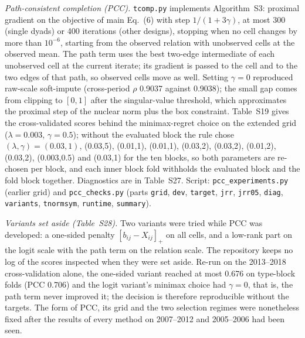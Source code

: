 \documentclass[journal]{IEEEtran}
\begin{document}
\emph{Path-consistent completion (PCC).} \texttt{tcomp.py} implements Algorithm~S3: proximal gradient on the objective of main Eq.~(6) with step $1/(1+3\gamma)$, at most 300 (single dyads) or 400 iterations (other designs), stopping when no cell changes by more than $10^{-6}$, starting from the observed relation with unobserved cells at the observed mean. The path term uses the best two-edge intermediate of each unobserved cell at the current iterate; its gradient is passed to the cell and to the two edges of that path, so observed cells move as well. Setting $\gamma=0$ reproduced raw-scale soft-impute (cross-period $\rho$ 0.9037 against 0.9038); the small gap comes from clipping to $[0,1]$ after the singular-value threshold, which approximates the proximal step of the nuclear norm plus the box constraint. Table~S19 gives the cross-validated scores behind the minimax-regret choice on the extended grid ($\lambda=0.003$, $\gamma=0.5$); without the evaluated block the rule chose $(\lambda,\gamma)=(0.03,1)$, (0.03,5), (0.01,1), (0.01,1), (0.03,2), (0.03,2), (0.01,2), (0.03,2), (0.003,0.5) and (0.03,1) for the ten blocks, so both parameters are re-chosen per block, and each inner block fold withholds the evaluated block and the fold block together. Diagnostics are in Table~S27. Script: \texttt{pcc\_experiments.py} (earlier grid) and \texttt{pcc\_checks.py} (parts \texttt{grid}, \texttt{dev}, \texttt{target}, \texttt{jrr}, \texttt{jrr05}, \texttt{diag}, \texttt{variants}, \texttt{tnormsym}, \texttt{runtime}, \texttt{summary}).

\emph{Variants set aside (Table~S28).} Two variants were tried while PCC was developed: a one-sided penalty $[b_{ij}-X_{ij}]_+$ on all cells, and a low-rank part on the logit scale with the path term on the relation scale. The repository keeps no log of the scores inspected when they were set aside. Re-run on the 2013--2018 cross-validation alone, the one-sided variant reached at most 0.676 on type-block folds (PCC 0.706) and the logit variant's minimax choice had $\gamma=0$, that is, the path term never improved it; the decision is therefore reproducible without the targets. The form of PCC, its grid and the two selection regimes were nonetheless fixed after the results of every method on 2007--2012 and 2005--2006 had been seen.
\end{document}

